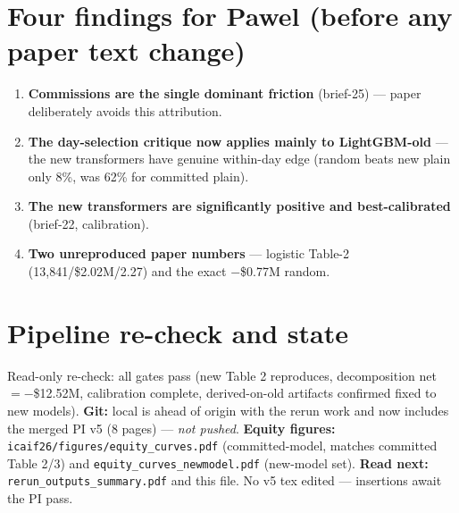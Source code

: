 \documentclass[11pt]{article}
\newcommand{\code}[1]{\texttt{\small #1}}
\begin{document}
\section{Four findings for Pawel (before any paper text change)}
\begin{enumerate}\itemsep2pt
\item \textbf{Commissions are the single dominant friction} (brief-25) --- paper deliberately avoids this attribution.
\item \textbf{The day-selection critique now applies mainly to LightGBM-old} --- the new transformers have genuine
within-day edge (random beats new plain only 8\%, was 62\% for committed plain).
\item \textbf{The new transformers are significantly positive and best-calibrated} (brief-22, calibration).
\item \textbf{Two unreproduced paper numbers} --- logistic Table-2 (13,841/\$2.02M/2.27) and the exact $-$\$0.77M random.
\end{enumerate}

\section{Pipeline re-check and state}
Read-only re-check: all gates pass (new Table 2 reproduces, decomposition net $=-$\$12.52M, calibration
complete, derived-on-old artifacts confirmed fixed to new models). \textbf{Git:} local is ahead of origin with
the rerun work and now includes the merged PI v5 (8 pages) --- \emph{not pushed}. \textbf{Equity figures:}
\code{icaif26/figures/equity\_curves.pdf} (committed-model, matches committed Table 2/3) and
\code{equity\_curves\_newmodel.pdf} (new-model set). \textbf{Read next:} \code{rerun\_outputs\_summary.pdf}
and this file. No v5 tex edited --- insertions await the PI pass.
\end{document}
